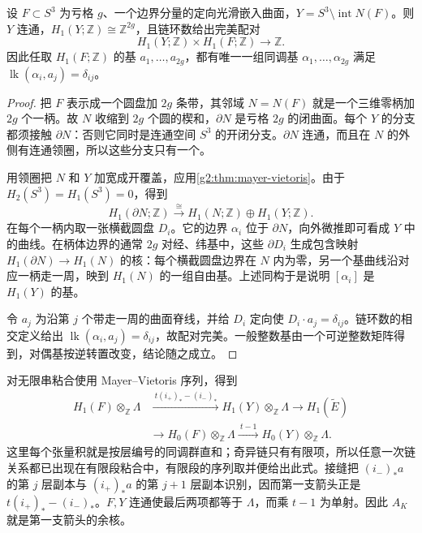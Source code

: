\begin{lemma}\label{g2:lem:seifert-linking-dual}
	设 \(F\subset S^3\) 为亏格 \(g\)、一个边界分量的定向光滑嵌入曲面，\(Y=S^3\setminus\operatorname{int}N(F)\)。则 \(Y\) 连通，\(H_1(Y;\mathbb Z)\cong\mathbb Z^{2g}\)，且链环数给出完美配对
	\[
		H_1(Y;\mathbb Z)\times H_1(F;\mathbb Z)\longrightarrow\mathbb Z.
	\]
	因此任取 \(H_1(F;\mathbb Z)\) 的基 \(a_1,\ldots,a_{2g}\)，都有唯一一组同调基 \(\alpha_1,\ldots,\alpha_{2g}\) 满足 \(\operatorname{lk}(\alpha_i,a_j)=\delta_{ij}\)。
\end{lemma}
\begin{proof}
	把 \(F\) 表示成一个圆盘加 \(2g\) 条带，其邻域 \(N=N(F)\) 就是一个三维零柄加 \(2g\) 个一柄。故 \(N\) 收缩到 \(2g\) 个圆的楔和，\(\partial N\) 是亏格 \(2g\) 的闭曲面。每个 \(Y\) 的分支都须接触 \(\partial N\)：否则它同时是连通空间 \(S^3\) 的开闭分支。\(\partial N\) 连通，而且在 \(N\) 的外侧有连通领圈，所以这些分支只有一个。

	用领圈把 \(N\) 和 \(Y\) 加宽成开覆盖，应用\cref{g2:thm:mayer-vietoris}。由于 \(H_2(S^3)=H_1(S^3)=0\)，得到
	\[
		H_1(\partial N;\mathbb Z)\xrightarrow{\ \cong\ }
		H_1(N;\mathbb Z)\oplus H_1(Y;\mathbb Z).
	\]
	在每个一柄内取一张横截圆盘 \(D_i\)。它的边界 \(\alpha_i\) 位于 \(\partial N\)，向外微推即可看成 \(Y\) 中的曲线。在柄体边界的通常 \(2g\) 对经、纬基中，这些 \(\partial D_i\) 生成包含映射 \(H_1(\partial N)\to H_1(N)\) 的核：每个横截圆盘边界在 \(N\) 内为零，另一个基曲线沿对应一柄走一周，映到 \(H_1(N)\) 的一组自由基。上述同构于是说明 \([\alpha_i]\) 是 \(H_1(Y)\) 的基。

	令 \(a_j\) 为沿第 \(j\) 个带走一周的曲面脊线，并给 \(D_i\) 定向使 \(D_i\cdot a_j=\delta_{ij}\)。链环数的相交定义给出 \(\operatorname{lk}(\alpha_i,a_j)=\delta_{ij}\)，故配对完美。一般整数基由一个可逆整数矩阵得到，对偶基按逆转置改变，结论随之成立。
\end{proof}

对无限串粘合使用 Mayer--Vietoris 序列，得到
\begin{equation}\label{g2:eq:cyclic-cover-mv}
	\begin{split}
	H_1(F)\otimes_{\mathbb Z}\Lambda
	&\xrightarrow{\ t(i_+)_*-(i_-)_*\ }
	H_1(Y)\otimes_{\mathbb Z}\Lambda\longrightarrow H_1(\widetilde E)\\
	&\longrightarrow H_0(F)\otimes_{\mathbb Z}\Lambda
	\xrightarrow{\ t-1\ }H_0(Y)\otimes_{\mathbb Z}\Lambda.
	\end{split}
\end{equation}
这里每个张量积就是按层编号的同调群直和；奇异链只有有限项，所以任意一次链关系都已出现在有限段粘合中，有限段的序列取并便给出此式。接缝把 \((i_-)_*a\) 的第 \(j\) 层副本与 \((i_+)_*a\) 的第 \(j+1\) 层副本识别，因而第一支箭头正是 \(t(i_+)_*-(i_-)_*\)。\(F,Y\) 连通使最后两项都等于 \(\Lambda\)，而乘 \(t-1\) 为单射。因此 \(A_K\) 就是第一支箭头的余核。

